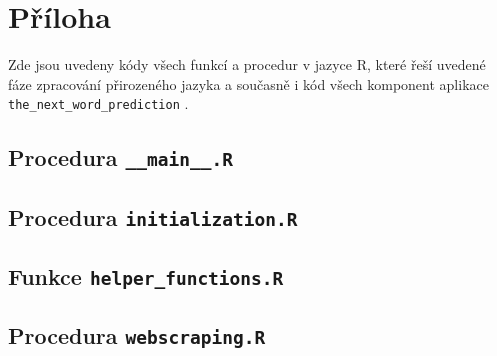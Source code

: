 
\section{Příloha}
\label{sec:Appendix}

Zde jsou uvedeny kódy všech funkcí a procedur v jazyce \textsf{R}, které
řeší uvedené fáze zpracování přirozeného jazyka%
 a současně i kód
všech komponent aplikace \texttt{the\_next\_word\_prediction}%
.


\subsection{Procedura \texttt{\_\_main\_\_.R}}




\subsection{Procedura \texttt{initialization.R}}




\subsection{Funkce \texttt{helper\_functions.R}}




\subsection{Procedura \texttt{webscraping.R}}




